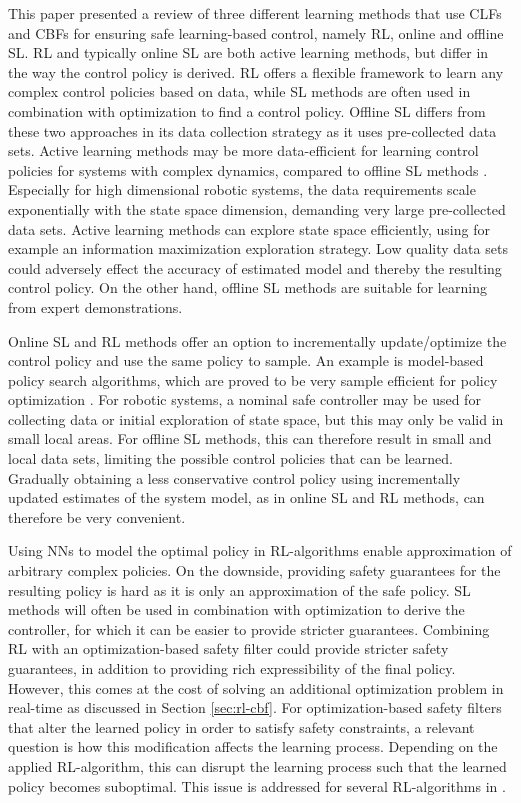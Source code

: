 \documentclass[3p,times,procedia]{elsarticle}
\begin{document}
This paper presented a review of three different learning methods that use CLFs and CBFs for ensuring safe learning-based control, namely RL, online and offline SL. RL and typically online SL are both active learning methods, but differ in the way the control policy is derived. RL offers a flexible framework to learn any complex control policies based on data, while SL methods are often used in combination with optimization to find a control policy. Offline SL differs from these two approaches in its data collection strategy as it uses pre-collected data sets. Active learning methods may be more data-efficient for learning control policies for systems with complex dynamics, compared to offline SL methods \cite{chatzilygeroudis2019}. Especially for high dimensional robotic systems, the data requirements scale exponentially with the state space dimension, demanding very large pre-collected data sets. Active learning methods can explore state space efficiently, using for example an information maximization exploration strategy. Low quality data sets could adversely effect the accuracy of estimated model and thereby the resulting control policy. On the other hand, offline SL methods are suitable for learning from expert demonstrations.


Online SL and RL methods offer an option to incrementally update/optimize the control policy and use the same policy to sample. An example is model-based policy search algorithms, which are proved to be very sample efficient for policy optimization \cite{chatzilygeroudis2019}. For robotic systems, a nominal safe controller may be used for collecting data or initial exploration of state space, but this may only be valid in small local areas. For offline SL methods, this can therefore result in small and local data sets, limiting the possible control policies that can be learned. Gradually obtaining a less conservative control policy using incrementally updated estimates of the system model, as in online SL and RL methods, can therefore be very convenient. 

Using NNs to model the optimal policy in RL-algorithms enable approximation of arbitrary complex policies. On the downside, providing safety guarantees for the resulting policy is hard as it is only an approximation of the safe policy. SL methods will often be used in combination with optimization to derive the controller, for which it can be easier to provide stricter guarantees. Combining RL with an optimization-based safety filter could provide stricter safety guarantees, in addition to providing rich expressibility of the final policy. However, this comes at the cost of solving an additional optimization problem in real-time as discussed in Section \ref{sec:rl-cbf}. For optimization-based safety filters that alter the learned policy in order to satisfy safety constraints, a relevant question is how this modification affects the learning process. Depending on the applied RL-algorithm, this can disrupt the learning process such that the learned policy becomes suboptimal. This issue is addressed for several RL-algorithms in \cite{gros2020safe}. 
\end{document}
